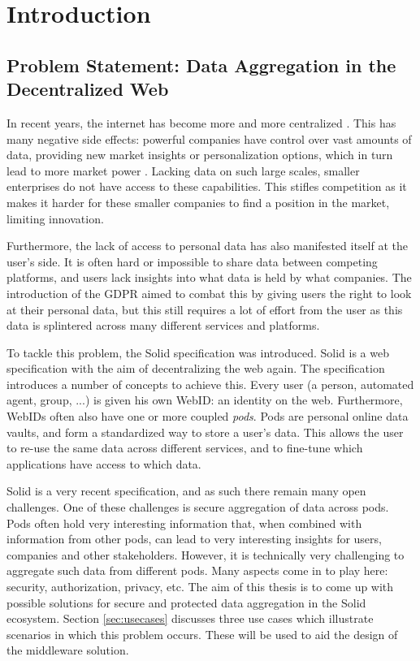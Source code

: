 \chapter{Introduction}
\label{cha:intro}

\section{Problem Statement: Data Aggregation in the Decentralized Web}
\label{sec:problem}
In recent years, the internet has become more and more centralized \citep{internet-report}. This has many negative side effects: powerful companies have control over vast amounts of data, providing new market insights or personalization options, which in turn lead to more market power \citep{big-tech-innovation, platform-monopolies}. Lacking data on such large scales, smaller enterprises do not have access to these capabilities. This stifles competition as it makes it harder for these smaller companies to find a position in the market, limiting innovation. 

Furthermore, the lack of access to personal data has also manifested itself at the user's side. It is often hard or impossible to share data between competing platforms, and users lack insights into what data is held by what companies. The introduction of the \gls{GDPR} \citep{GDPR} aimed to combat this by giving users the right to look at their personal data, but this still requires a lot of effort from the user as this data is splintered across many different services and platforms. 

To tackle this problem, the Solid \citep{solid} specification was introduced. Solid is a web specification with the aim of decentralizing the web again. The specification introduces a number of concepts to achieve this. Every user (a person, automated agent, group, ...) is given his own WebID: an identity on the web. Furthermore, WebIDs often also have one or more coupled \textit{pods}. Pods are personal online data vaults, and form a standardized way to store a user's data. This allows the user to re-use the same data across different services, and to fine-tune which applications have access to which data.

Solid is a very recent specification, and as such there remain many open challenges. One of these challenges is secure aggregation of data across pods. Pods often hold very interesting information that, when combined with information from other pods, can lead to very interesting insights for users, companies and other stakeholders. However, it is technically very challenging to aggregate such data from different pods. Many aspects come in to play here: security, authorization, privacy, etc. The aim of this thesis is to come up with possible solutions for secure and protected data aggregation in the Solid ecosystem. Section \ref{sec:usecases} discusses three use cases which illustrate scenarios in which this problem occurs. These will be used to aid the design of the middleware solution.

